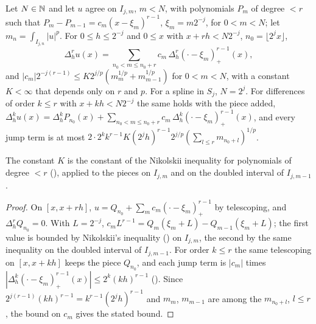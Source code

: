 \begin{lemma}
\label{lem:spline-across}
\leanok
{}
Let $N \in \mathbb{N}$ and let $u$ agree on $I_{j,m}$, $m < N$, with polynomials $P_m$ of degree $< r$ such
that $P_m - P_{m-1} = c_m (x - \xi_m)^{r-1}$, $\xi_m = m 2^{-j}$, for $0 < m < N$; let
$m_n = \int_{I_{j,n}} |u|^p$. For $0 \leq h \leq 2^{-j}$ and $0 \leq x$ with $x + rh < N 2^{-j}$,
$n_0 = \lfloor 2^j x \rfloor$,
\[
  \Delta_h^r u(x) = \sum_{n_0 < m \leq n_0 + r} c_m \, \Delta_h^r (\cdot - \xi_m)_+^{r-1}(x),
\]
and $|c_m| 2^{-j(r-1)} \leq K 2^{j/p} (m_m^{1/p} + m_{m-1}^{1/p})$ for $0 < m < N$, with a
constant $K < \infty$ that depends only on $r$ and $p$. For a spline in
$S_j$, $N = 2^j$. For differences of order $k \leq r$ with $x + kh < N 2^{-j}$ the same holds
with the piece added, $\Delta_h^k u(x) = \Delta_h^k P_{n_0}(x) +
\sum_{n_0 < m \leq n_0 + r} c_m \, \Delta_h^k (\cdot - \xi_m)_+^{r-1}(x)$, and every jump term is
at most $2 \cdot 2^k k^{r-1} K (2^j h)^{r-1} 2^{j/p} (\sum_{l \leq r} m_{n_0+l})^{1/p}$.
\end{lemma}

The constant $K$ is the constant of the Nikolskii inequality for polynomials of degree $< r$
(), applied to the pieces on $I_{j,m}$ and on the doubled interval
of $I_{j,m-1}$.

\begin{proof}
\leanok
On $[x, x + rh]$, $u = Q_{n_0} + \sum_m c_m (\cdot - \xi_m)_+^{r-1}$ by telescoping, and
$\Delta_h^r Q_{n_0} = 0$. With $L = 2^{-j}$,
$c_m L^{r-1} = Q_m(\xi_m + L) - Q_{m-1}(\xi_m + L)$; the first value is bounded by Nikolskii's
inequality () on $I_{j,m}$, the second by the same inequality on
the doubled interval of $I_{j,m-1}$. For order $k \leq r$ the same telescoping on $[x, x + kh]$
keeps the piece $Q_{n_0}$, and each jump term is $|c_m|$ times
$|\Delta_h^k (\cdot - \xi_m)_+^{r-1}(x)| \leq 2^k (kh)^{r-1}$
(). Since $2^{j(r-1)} (kh)^{r-1} = k^{r-1} (2^j h)^{r-1}$ and
$m_m$, $m_{m-1}$ are among the $m_{n_0+l}$, $l \leq r$, the bound on $c_m$ gives the stated
bound.
\end{proof}

